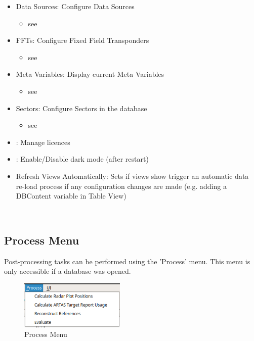 \begin{itemize}
 \item Data Sources: Configure Data Sources
  \begin{itemize}
   \item see 
  \end{itemize}
 \item FFTs: Configure Fixed Field Transponders
  \begin{itemize}
   \item see 
  \end{itemize}
 \item Meta Variables: Display current Meta Variables
  \begin{itemize}
   \item see 
  \end{itemize}
 \item Sectors: Configure Sectors in the database
  \begin{itemize}
   \item see 
  \end{itemize}
 \item {}: Manage licences
 \item {}: Enable/Disable dark mode (after restart)
 \item Refresh Views Automatically: Sets if views show trigger an automatic data re-load process if any configuration changes are made (e.g. adding a DBContent variable in Table View)
\end{itemize}
\  \\ 

\subsection{Process Menu}
\label{sec:ui_overview_process_menu}

Post-processing tasks can be performed using the 'Process' menu. This menu is only accessible if a database was opened.

\begin{figure}[H]
  \center
    \includegraphics[width=5cm,frame]{figures/ui_process_menu.png}
  \caption{Process Menu}
\end{figure}

